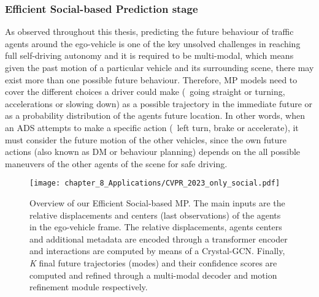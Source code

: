 \subsubsection{Efficient Social-based Prediction stage}
\label{subsubsec:8_decision_making_our_approach_prediction}

As observed throughout this thesis, predicting the future behaviour of traffic agents around the ego-vehicle is one of the key unsolved challenges in reaching full self-driving autonomy and it is required to be multi-modal, which means given the past motion of a particular vehicle and its surrounding scene, there may exist more than one possible future behaviour. Therefore, MP models need to cover the different choices a driver could make (\ie \ going straight or turning, accelerations or slowing down) as a possible trajectory in the immediate future or as a probability distribution of the agents future location. In other words, when an \ac{ADS} attempts to make a specific action (\eg \ left turn, brake or accelerate), it must consider the future motion of the other vehicles, since the own future actions (also known as \ac{DM} or behaviour planning) depends on the all possible maneuvers of the other agents of the scene for safe driving. %

\begin{figure}[h]
	\centering
	\setlength{\tabcolsep}{2.0pt}
	\texttt{[image: chapter\_8\_Applications/CVPR\_2023\_only\_social.pdf]}
	\captionsetup{justification=justified}
	\caption[Overview of our Efficient Social-based \ac{MP}]{Overview of our Efficient Social-based \ac{MP}. The main inputs are the relative displacements and centers (last observations) of the agents in the ego-vehicle frame. The relative displacements, agents centers and additional metadata are encoded through a transformer encoder and interactions are computed by means of a Crystal-\ac{GCN}. Finally, \textit{K} final future trajectories (modes) and their confidence scores are computed and refined through a multi-modal decoder and motion refinement module respectively.}
	
	\label{fig:chapter_8_Applications/CVPR_2023_only_social}
\end{figure}

